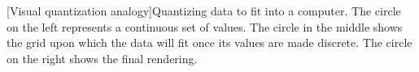 [Visual quantization analogy]Quantizing data to fit into a computer. The circle on the left represents a continuous set of values. The circle in the middle shows the grid upon which the data will fit once its values are made discrete. The circle on the right shows the final rendering.